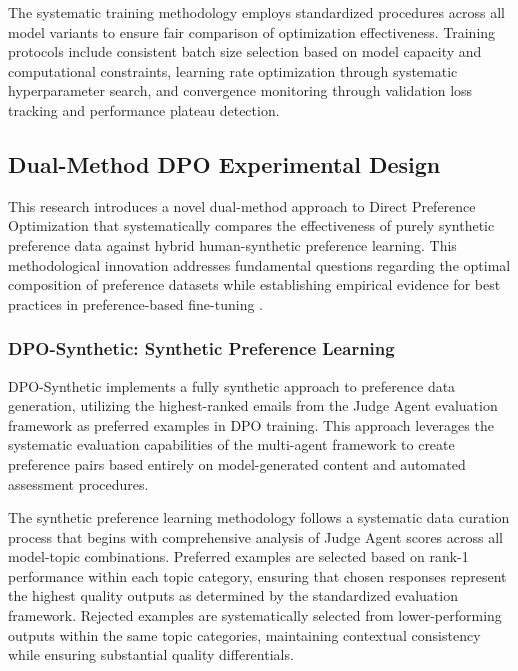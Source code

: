 The systematic training methodology employs standardized procedures across all model variants to ensure fair comparison of optimization effectiveness. Training protocols include consistent batch size selection based on model capacity and computational constraints, learning rate optimization through systematic hyperparameter search, and convergence monitoring through validation loss tracking and performance plateau detection.

\subsection{Dual-Method DPO Experimental Design}
\label{sec:dual-method-dpo}

This research introduces a novel dual-method approach to Direct Preference Optimization that systematically compares the effectiveness of purely synthetic preference data against hybrid human-synthetic preference learning. This methodological innovation addresses fundamental questions regarding the optimal composition of preference datasets while establishing empirical evidence for best practices in preference-based fine-tuning \cite{gallego2024configurable_safety, chen2024refined_dpo}.

\subsubsection{DPO-Synthetic: Synthetic Preference Learning}

DPO-Synthetic implements a fully synthetic approach to preference data generation, utilizing the highest-ranked emails from the Judge Agent evaluation framework as preferred examples in DPO training. This approach leverages the systematic evaluation capabilities of the multi-agent framework to create preference pairs based entirely on model-generated content and automated assessment procedures.

The synthetic preference learning methodology follows a systematic data curation process that begins with comprehensive analysis of Judge Agent scores across all model-topic combinations. Preferred examples are selected based on rank-1 performance within each topic category, ensuring that chosen responses represent the highest quality outputs as determined by the standardized evaluation framework. Rejected examples are systematically selected from lower-performing outputs within the same topic categories, maintaining contextual consistency while ensuring substantial quality differentials.

